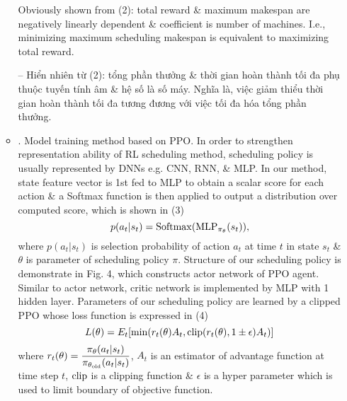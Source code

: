 \documentclass{article}
\begin{document}
\begin{itemize}
\begin{itemize}
        Obviously shown from (2): total reward \& maximum makespan are negatively linearly dependent \& coefficient is number of machines. I.e., minimizing maximum scheduling makespan is equivalent to maximizing total reward.

        -- Hiển nhiên từ (2): tổng phần thưởng \& thời gian hoàn thành tối đa phụ thuộc tuyến tính âm \& hệ số là số máy. Nghĩa là, việc giảm thiểu thời gian hoàn thành tối đa tương đương với việc tối đa hóa tổng phần thưởng.
        \item {. Model training method based on PPO.} In order to strengthen representation ability of RL scheduling method, scheduling policy is usually represented by DNNs e.g. CNN, RNN, \& MLP. In our method, state feature vector is 1st fed to MLP to obtain a scalar score for each action \& a Softmax function is then applied to output a distribution over computed score, which is shown in (3)
        \begin{equation*}
            p(a_t|s_t) = {\rm Softmax}({\rm MLP}_{\pi_\theta}(s_t)),
        \end{equation*}
        where $p(a_t|s_t)$ is selection probability of action $a_t$ at time $t$ in state $s_t$ \& $\theta$ is parameter of scheduling policy $\pi$. Structure of our scheduling policy is demonstrate in {\sf Fig. 4}, which constructs actor network of PPO agent. Similar to actor network, critic network is implemented by MLP with 1 hidden layer. Parameters of our scheduling policy are learned by a clipped PPO whose loss function is expressed in (4)
        \begin{equation*}
            L(\theta) = E_t[\min(r_t(\theta)A_t,{\rm clip}(r_t(\theta),1\pm\epsilon)A_t)]
        \end{equation*}
        where $r_t(\theta) = \dfrac{\pi_\theta(a_t|s_t)}{\pi_{\theta_{\rm old}}(a_t|s_t)}$, $A_t$ is an estimator of advantage function at time step $t$, ${\rm clip}$ is a clipping function \& $\epsilon$ is a hyper parameter which is used to limit boundary of objective function.


\end{itemize}
\end{itemize}
\end{document}
